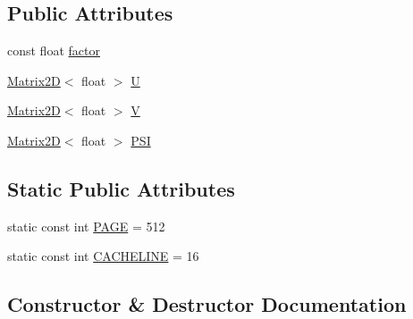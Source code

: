 \subsection*{Public Attributes}
\begin{DoxyCompactItemize}
\item 
const float \hyperlink{struct_u_vfrom_p_s_i___s_s_e_3_01float_01_4_a0cdc869087c869067277eae491256240}{factor}
\item 
\hyperlink{class_matrix2_d}{Matrix2\+D}$<$ float $>$ \hyperlink{struct_u_vfrom_p_s_i___s_s_e_3_01float_01_4_aabb930a81564e88a23524891da5f45a9}{U}
\item 
\hyperlink{class_matrix2_d}{Matrix2\+D}$<$ float $>$ \hyperlink{struct_u_vfrom_p_s_i___s_s_e_3_01float_01_4_a377c8c663c9d5a4552f9fa943fbfd826}{V}
\item 
\hyperlink{class_matrix2_d}{Matrix2\+D}$<$ float $>$ \hyperlink{struct_u_vfrom_p_s_i___s_s_e_3_01float_01_4_abc94af3bcf4d3d119bcc0290484ead90}{P\+S\+I}
\end{DoxyCompactItemize}
\subsection*{Static Public Attributes}
\begin{DoxyCompactItemize}
\item 
static const int \hyperlink{struct_u_vfrom_p_s_i___s_s_e_3_01float_01_4_a0676bb743f7fca184c9b78ba95b38130}{P\+A\+G\+E} = 512
\item 
static const int \hyperlink{struct_u_vfrom_p_s_i___s_s_e_3_01float_01_4_a5ad54c9a7e5e60f5fb1962e176134624}{C\+A\+C\+H\+E\+L\+I\+N\+E} = 16
\end{DoxyCompactItemize}


\subsection{Constructor \& Destructor Documentation}
\hypertarget{struct_u_vfrom_p_s_i___s_s_e_3_01float_01_4_ae8cbc637b76f83a4e5ed40a20a9f7576}{}
